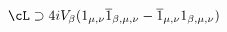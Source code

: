 \begin{equation}
\cL \supset 
4 i V_{\beta} ( 1_{\mu , \nu} \overline{1}_{\beta , \mu , \nu} -
\overline{1}_{\mu , \nu} 1_{\beta , \mu , \nu} ) \label{lcvab}
\end{equation} 
